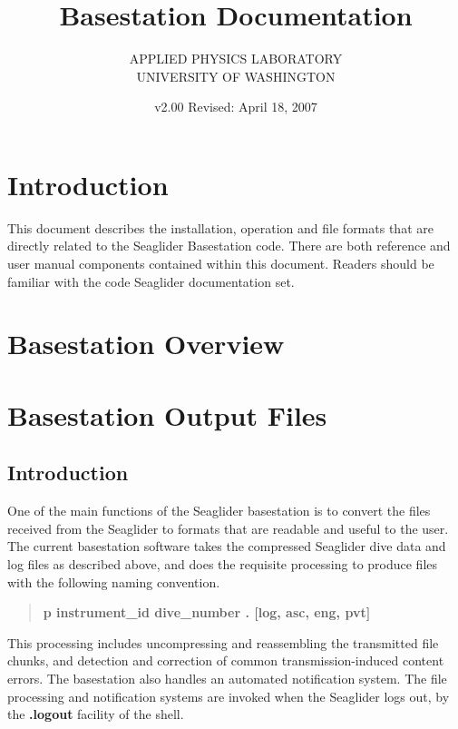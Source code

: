 \documentclass[12pt,english,twoside]{book}
\begin{document}
\title{Basestation Documentation}


\author{APPLIED PHYSICS LABORATORY \\
 UNIVERSITY OF WASHINGTON}


\date{v2.00 Revised: April 18, 2007}

\maketitle
\tableofcontents{}

\chapter{Introduction}

This document describes the installation, operation and file formats that are
directly related to the Seaglider Basestation code.  There are both reference
and user manual components contained within this document.  Readers should be
familiar with the code Seaglider documentation set.

\chapter{Basestation Overview}

\chapter{Basestation Output Files}

\section{Introduction}

One of the main functions of the Seaglider basestation is to convert
the files received from the Seaglider to formats that are readable
and useful to the user. The current basestation software takes the
compressed Seaglider dive data and log files as described above, and
does the requisite processing to produce files with the following
naming convention.

\begin{quote}
\textbf{p instrument\_id dive\_number . {[}log, asc, eng, pvt]}
\end{quote}
This processing includes uncompressing and reassembling the transmitted
file chunks, and detection and correction of common transmission-induced
content errors. The basestation also handles an automated notification
system. The file processing and notification systems are invoked when
the Seaglider logs out, by the \textbf{.logout} facility of the shell.
\end{document}
